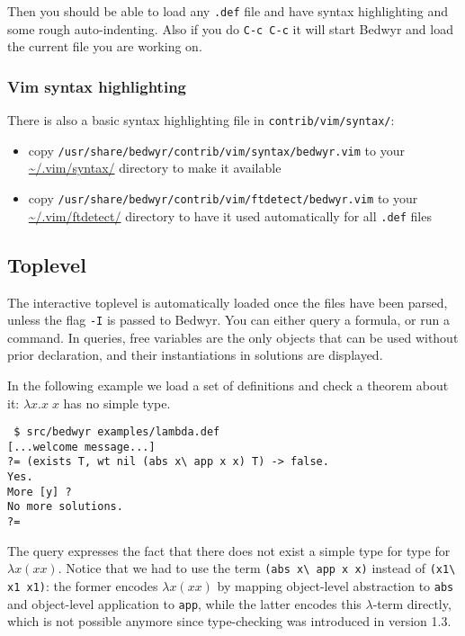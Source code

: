 \documentclass{article}
\begin{document}
Then you should be able to load any \verb:.def: file
and have syntax highlighting and some rough auto-indenting.
Also if you do \verb.C-c C-c. it will start Bedwyr
and load the current file you are working on.

\subsubsection{Vim syntax highlighting}

There is also a basic syntax highlighting file in
\verb;contrib/vim/syntax/;:
\begin{itemize}
  \item copy {\tt /usr/share/bedwyr/contrib/vim/syntax/bedwyr.vim} to
    your \url{~/.vim/syntax/} directory to make it available
  \item copy {\tt /usr/share/bedwyr/contrib/vim/ftdetect/bedwyr.vim} to
    your \url{~/.vim/ftdetect/} directory to have it used automatically
    for all {\tt *.def} files
\end{itemize}

\subsection{Toplevel}

The interactive toplevel is automatically loaded once the files have
been parsed, unless the flag \verb.-I. is passed to Bedwyr. You can
either query a formula, or run a command. In queries, free variables are
the only objects that can be used without prior declaration, and their
instantiations in solutions are displayed.

In the following example we load a set of definitions and check a
theorem about it: $\lambda x.x\;x$ has no simple type.

\begin{verbatim}
 $ src/bedwyr examples/lambda.def
[...welcome message...]
?= (exists T, wt nil (abs x\ app x x) T) -> false.
Yes.
More [y] ?
No more solutions.
?=
\end{verbatim}

The query expresses the fact that there does not exist a simple type for
type for $\lambda x (x x)$.
Notice that we had to use the term \verb+(abs x\ app x x)+ instead of
\verb+(x1\ x1 x1)+: the former encodes $\lambda x (x x)$ by mapping
object-level abstraction to {\tt abs} and object-level application to
{\tt app}, while the latter encodes this $\lambda$-term directly,
which is not possible anymore since type-checking was introduced in
version 1.3.
\end{document}

